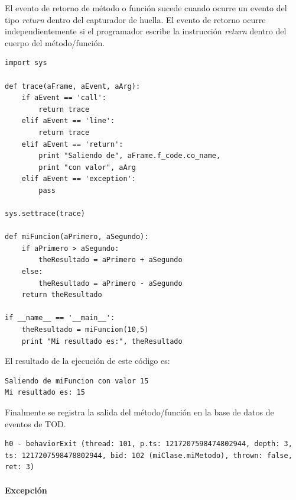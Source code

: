 \documentclass[12pt,legalpaper]{report}
\begin{document}
El evento de retorno de método o función sucede cuando ocurre un evento del tipo \textit{return} dentro del capturador de huella.  El evento de retorno ocurre independientemente si el programador escribe la instrucción \textit{return} dentro del cuerpo del método/función.			

\begin{singlespace}
\begin{lstlisting}[style=Python]
import sys

def trace(aFrame, aEvent, aArg):
    if aEvent == 'call':
        return trace
    elif aEvent == 'line':
        return trace
    elif aEvent == 'return':
        print "Saliendo de", aFrame.f_code.co_name, 
        print "con valor", aArg
    elif aEvent == 'exception':
        pass

sys.settrace(trace)

def miFuncion(aPrimero, aSegundo):
    if aPrimero > aSegundo:
        theResultado = aPrimero + aSegundo
    else:
        theResultado = aPrimero - aSegundo
    return theResultado

if __name__ == '__main__':
    theResultado = miFuncion(10,5)
    print "Mi resultado es:", theResultado
\end{lstlisting}
\end{singlespace}

El resultado de la ejecución de este código es:

\begin{singlespace}
\begin{lstlisting}[style=consola,numbers=none]
Saliendo de miFuncion con valor 15
Mi resultado es: 15
\end{lstlisting}
\end{singlespace}	


Finalmente se registra la salida del método/función en la base de datos de eventos de TOD.

\begin{singlespace}
\begin{lstlisting}[style=consola,numbers=none]
h0 - behaviorExit (thread: 101, p.ts: 1217207598474802944, depth: 3, ts: 1217207598478802944, bid: 102 (miClase.miMetodo), thrown: false, ret: 3)
\end{lstlisting}
\end{singlespace}	

				      
				\paragraph{Excepción}
				
\end{document}
